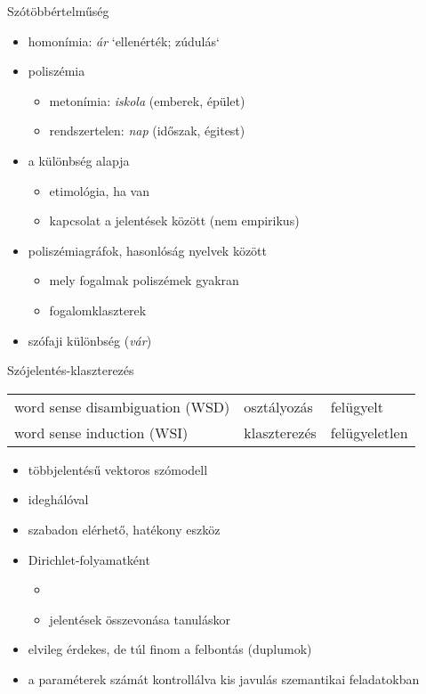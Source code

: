 \documentclass{beamer}
\begin{document}
\begin{frame}{Szótöbbértelműség}
  \begin{itemize}
    \item homonímia: \emph{ár} `ellenérték; zúdulás`
    \item poliszémia
      \begin{itemize}
        \item metonímia: \emph{iskola} (emberek, épület)
        \item rendszertelen: \emph{nap} (időszak, égitest)
      \end{itemize}
    \item a különbség alapja
      \begin{itemize} 
        \item etimológia, ha van
        \item kapcsolat a jelentések között (nem empirikus)
      \end{itemize}

    \item poliszémiagráfok, hasonlóság nyelvek között \citep{Youn:2016}
      \begin{itemize}
        \item mely fogalmak poliszémek gyakran
        \item fogalomklaszterek
      \end{itemize}
    \item szófaji különbség (\emph{vár})
  \end{itemize}
\end{frame}
\begin{frame}{Szójelentés-klaszterezés}
  \begin{tabular}{lll}
    word sense disambiguation (WSD) & osztályozás & felügyelt \\
      word sense induction (WSI) \citep{Schutze:1998} & klaszterezés & felügyeletlen \\
  \end{tabular}
    \begin{itemize}
      \item többjelentésű vektoros szómodell \citep{Reisinger:2010}
      \item ideghálóval \citep{Huang:2012}
      \item szabadon elérhető, hatékony eszköz \citep{Neelakantan:2014}
      \item Dirichlet-folyamatként 
        \begin{itemize}
          \item \cite{Li:2015}
          \item jelentések összevonása tanuláskor \citep{Bartunov:2015}
        \end{itemize}
      \item elvileg érdekes, de túl finom a felbontás (duplumok)
      \item a paraméterek számát kontrollálva kis javulás szemantikai
        feladatokban \citep{Li:2015}
    \end{itemize}
\end{frame}
\end{document}
